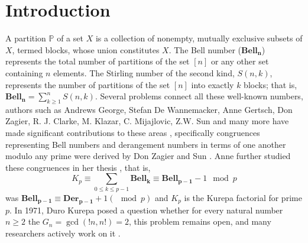 \documentclass[pdflatex,sn-mathphys-num]{sn-jnl}%
\theoremstyle{thmstyleone}%
\theoremstyle{thmstyletwo}%
\theoremstyle{thmstylethree}%
\begin{document}



\maketitle
\tableofcontents
\section{Introduction}\label{sec1}
A partition $\mathbb{P}$ of a set $X$ is a collection of nonempty, mutually exclusive subsets of $X$, termed blocks, whose union constitutes $X$. The Bell number ($\mathbf{Bell_n}$) represents the total number of partitions of the set $[n]$ or any other set containing $n$ elements. The Stirling number of the second kind, $S(n,k)$, represents the number of partitions of the set $[n]$ into exactly $k$ blocks; that is, $ \mathbf{Bell_n}=\sum_{k\geq 1}^nS(n,k).$ Several problems connect all these well-known numbers, authors such as Andrews George, Stefan De Wannemacker, Anne Gertsch, Don Zagier, R. J. Clarke, M. Klazar, C. Mijajlovic, Z.W. Sun and many more have made significant contributions to these areas \cite{andrews1998theory, sun2011curious, gertsch1996some, clarke1993derangements, guy2004unsolved, klazar2003bell, ivic2003kurepa, mijajlovic2021fifty, mijajlovic1990some, petojevic2023new}, specifically congruences representing Bell numbers and derangement numbers in terms of one another modulo any prime were derived by Don Zagier and Sun \cite{sun2011curious}. Anne further studied these congruences in her thesis \cite{gertsch1999congruences}, that is,  
\begin{equation*}
    K_p\equiv \sum_{0\leq k\leq p-1}\mathbf{Bell_{k}} \equiv \mathbf{Bell_{p-1}}- 1\mod{p}
\end{equation*}
was $\mathbf{Bell_{p-1}}\equiv \mathbf{Der_{p-1}}+ 1(\mod{p})$ and $K_p$ is the Kurepa factorial for prime $p$. In 1971, Duro Kurepa \cite{kurepa1971left} posed a question whether for every natural number $n\geq2$ the $G_n=\gcd(!n,n!)=2$, this problem remains open, and many researchers actively work on it \cite{barsky2004nombres, barsky2011erratum, mevstrovic2013variations, mijajlovic1990some, mijajlovic2021fifty, petojevic1999trees, petojevic2023new, andrejic2016searching, vsami1974m, ivic2003kurepa, abramov2022kurepa}.
\end{document}
